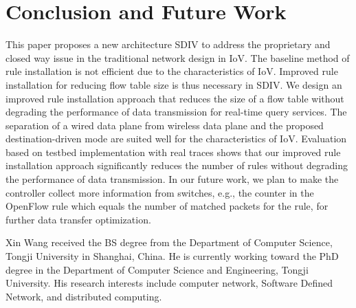 \documentclass[journal]{IEEEtran}
\begin{document}
\section{Conclusion and Future Work} \label{Conclusion}
This paper proposes a new architecture SDIV to address the proprietary and closed way issue in the traditional network design in IoV. The baseline method of rule installation is not efficient due to the characteristics of IoV. Improved rule installation for reducing flow table size is thus necessary in SDIV. We design an improved rule installation approach that reduces the size of a flow table without degrading the performance of data transmission for real-time query services. The separation of a wired data plane from wireless data plane and the proposed destination-driven mode are suited well for the characteristics of IoV. Evaluation based on testbed implementation with real traces shows that our improved rule installation approach significantly reduces the number of rules without degrading the performance of data transmission. In our future work, we plan to make the controller collect more information from switches, e.g., the counter in the OpenFlow rule which equals the number of matched packets for the rule, for further data transfer optimization.












\begin{IEEEbiography}{Xin Wang}
received the BS degree from the Department of Computer Science, Tongji University in Shanghai, China. He is currently working toward the PhD degree in the Department of Computer Science and Engineering, Tongji University. His research interests include computer network, Software Defined Network, and distributed computing.
\end{IEEEbiography}
\end{document}
